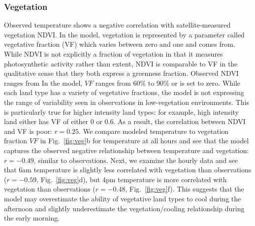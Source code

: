 \documentclass[draft,linenumbers]{agujournal}
\begin{document}
\subsubsection{Vegetation}
Observed temperature shows a negative correlation with satellite-measured vegetation NDVI. In the model, vegetation is represented by a parameter called vegetative fraction (VF) which varies between zero and one and comes from.%
While NDVI is not explicitly a fraction of vegetation in that it measures photosynthetic activity rather than extent, NDVI is comparable to VF in the qualitative sense that they both express a greenness fraction. Observed NDVI ranges from In the model, $VF$ ranges from 60\% to 90\% or is set to zero. While each land type has a variety of vegetative fractions, the model is not expressing the range of variability seen in observations in low-vegetation environments. This is particularly true for higher intensity land types: for example, high intensity land either has VF of either 0 or 0.6. As a result, the correlation between NDVI and VF is poor: $r=0.25$. 
We compare modeled temperature to vegetation fraction $VF$ in Fig.~\ref{fig:veg}b for temperature at all hours and see that
the model captures the observed negative relationship between temperature and vegetation: $r= -0.49$, similar to observations. Next, we examine the hourly data and see that 6am temperature is slightly less correlated with vegetation than observations ($r= -0.59$, Fig.~\ref{fig:veg}d), but 4pm temperature is more correlated with vegetation than observations ($r= -0.48$, Fig.~\ref{fig:veg}f). This suggests that the model may overestimate the ability of vegetative land types to cool during the afternoon and slightly underestimate the vegetation/cooling relationship during the early morning. 
\end{document}
